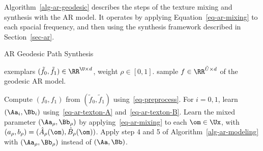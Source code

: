 Algorithm~\ref{alg-ar-geodesic} describes the steps of the texture mixing and synthesis with the AR model. It operates by applying Equation~\eqref{eq-ar-mixing} to each spacial frequency, and then using the synthesis framework described in Section~\ref{sec-ar}.


\begin{algorithm}[ht!]
\caption{AR Geodesic Path Synthesis}
\label{alg-ar-geodesic}
\begin{algorithmic}[1]
\Require exemplars $(\tilde f_0, \tilde f_1) \in \RR^{\U \times d}$, weight $\rho \in [0,1]$.
\Ensure sample $f \in \RR^{\tilde U \times d}$ of the geodesic AR model.
\Statex
\begin{enumerate}
	 Compute $(f_0,f_1)$ from $(\tilde f_0, \tilde f_1)$ 
			using~\eqref{eq-preprocess}.
	 For $i=0,1$, learn $(\Aa_i,\Bb_i)$ using~\eqref{eq-ar-texton-A} and~\eqref{eq-ar-texton-B}.
	 Learn the mixed parameter $(\Aa_\rho,\Bb_\rho)$ by applying~\eqref{eq-ar-mixing} to each $\om \in \Ux$, with $(a_\rho,b_\rho) = (\hat A_\rho(\om), \hat B_\rho(\om))$.
	 Apply step 4 and 5 of Algorithm~\ref{alg-ar-modeling}
		with $(\Aa_\rho,\Bb_\rho)$ instead of $(\Aa,\Bb)$. 
\end{enumerate}
\end{algorithmic}
\end{algorithm}
